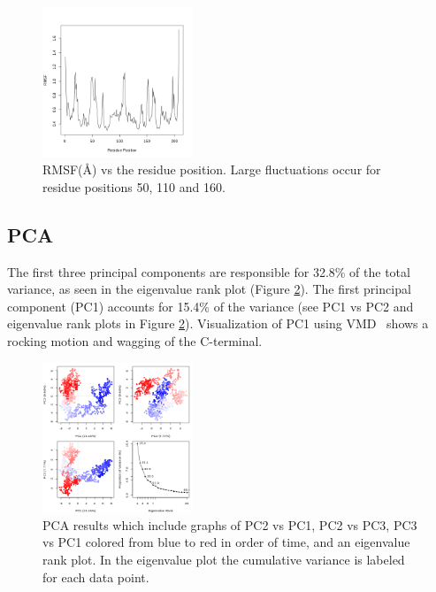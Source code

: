 \documentclass[twocolumn]{bmcart}%
\begin{document}
\begin{figure}[ht!]
  \includegraphics[width=0.4\textwidth]{htmd_analysis_rmsf}
  \caption{
      RMSF(\AA) vs the residue position. Large fluctuations occur for residue positions 50, 110 and 160. }
\label{fig:rmsf}
\end{figure}

\subsection*{PCA}

The first three principal components are responsible for 32.8\% of the total variance, as seen in the eigenvalue rank plot (Figure \ref{fig:pca}). The first principal component (PC1) accounts for 15.4\% of the variance (see PC1 vs PC2 and eigenvalue rank plots in Figure \ref{fig:pca}). Visualization of PC1 using VMD~\cite{hump_vmd_1996} shows a rocking motion and wagging of the C-terminal.


\begin{figure}[ht!]
  \includegraphics[width=0.4\textwidth]{htmd_analysis_pca}
  \caption{
      PCA results which include graphs of PC2 vs PC1, PC2 vs PC3, PC3 vs PC1  colored from blue to red in order of time, and an eigenvalue rank plot. In the eigenvalue plot the cumulative variance is labeled for each data point.}
 \label{fig:pca}
 \end{figure}
\end{document}
